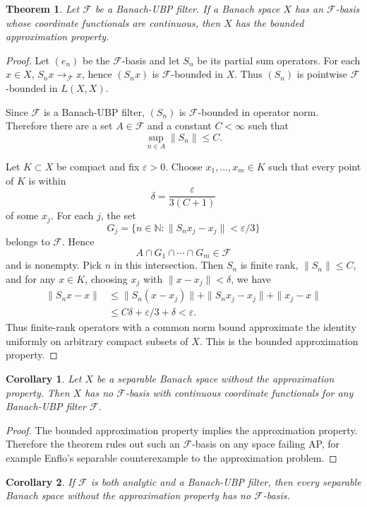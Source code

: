 \documentclass[11pt]{article}
\newtheorem{theorem}{Theorem}
\newtheorem{corollary}{Corollary}
\newcommand{\F}{\mathcal F}
\newcommand{\N}{\mathbb N}
\begin{document}
\begin{theorem}
Let $\F$ be a Banach-UBP filter.  If a Banach space $X$ has an $\F$-basis whose
coordinate functionals are continuous, then $X$ has the bounded approximation
property.
\end{theorem}

\begin{proof}
Let $(e_n)$ be the $\F$-basis and let $S_n$ be its partial sum operators.  For
each $x\in X$, $S_nx\to_\F x$, hence $(S_nx)$ is $\F$-bounded in $X$.  Thus
$(S_n)$ is pointwise $\F$-bounded in $L(X,X)$.

Since $\F$ is a Banach-UBP filter, $(S_n)$ is $\F$-bounded in operator norm.
Therefore there are a set $A\in\F$ and a constant $C<\infty$ such that
\[
  \sup_{n\in A}\|S_n\|\le C.
\]

Let $K\subset X$ be compact and fix $\varepsilon>0$.  Choose
$x_1,\ldots,x_m\in K$ such that every point of $K$ is within
\[
  \delta=\frac{\varepsilon}{3(C+1)}
\]
of some $x_j$.  For each $j$, the set
\[
  G_j=\{n\in\N:\|S_nx_j-x_j\|<\varepsilon/3\}
\]
belongs to $\F$.  Hence
\[
  A\cap G_1\cap\cdots\cap G_m\in\F
\]
and is nonempty.  Pick $n$ in this intersection.  Then $S_n$ is finite rank,
$\|S_n\|\le C$, and for any $x\in K$, choosing $x_j$ with
$\|x-x_j\|<\delta$, we have
\[
\begin{aligned}
\|S_nx-x\|
&\le \|S_n(x-x_j)\|+\|S_nx_j-x_j\|+\|x_j-x\| \\
&\le C\delta+\varepsilon/3+\delta <\varepsilon.
\end{aligned}
\]
Thus finite-rank operators with a common norm bound approximate the identity
uniformly on arbitrary compact subsets of $X$.  This is the bounded
approximation property.
\end{proof}

\begin{corollary}
Let $X$ be a separable Banach space without the approximation property.  Then
$X$ has no $\F$-basis with continuous coordinate functionals for any Banach-UBP
filter $\F$.
\end{corollary}

\begin{proof}
The bounded approximation property implies the approximation property.
Therefore the theorem rules out such an $\F$-basis on any space failing AP,
for example Enflo's separable counterexample to the approximation problem.
\end{proof}

\begin{corollary}
If $\F$ is both analytic and a Banach-UBP filter, then every separable Banach
space without the approximation property has no $\F$-basis.
\end{corollary}
\end{document}
